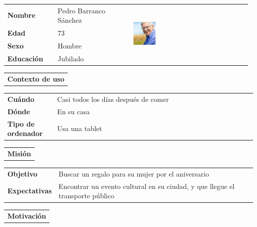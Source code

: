 \documentclass[11pt]{article}
\begin{document}
\newpage
\begin{table}[H]
  \centering
  \begin{tabular}{p{0.2\linewidth}|p{0.3\linewidth}p{0.475\linewidth}}
    \toprule
    \textbf{Nombre} & Pedro Barranco Sánchez &\multirow{4}{*}{\begin{minipage}{1.\textwidth}\includegraphics[width=0.2\textwidth, height=30mm]{Pedro}\end{minipage}}\\
    \textbf{Edad} & 73 & \\
    \textbf{Sexo} & Hombre & \\
    \textbf{Educación} & Jubilado & \\
    \bottomrule
  \end{tabular}

  \begin{tabular}{l}
    \textbf{Contexto de uso} 
  \end{tabular}
  
  \begin{tabular}{p{0.2\linewidth}|p{0.8\linewidth}}
    \toprule
    \textbf{Cuándo} & Casi todos los días después de comer\\
    \textbf{Dónde}  & En su casa\\
    \textbf{Tipo de ordenador} & Usa una tablet\\
    \bottomrule
  \end{tabular}

  \begin{tabular}{l}
    \textbf{Misión} 
  \end{tabular}
  
  \begin{tabular}{p{0.2\linewidth}|p{0.8\linewidth}}
    \toprule
    \textbf{Objetivo} & Buscar un regalo para su mujer por el aniversario\\
    \textbf{Expectativas}  & Encontrar un evento cultural en su ciudad, y que llegue el transporte público \\
    \bottomrule
  \end{tabular}

  \begin{tabular}{l}
    \textbf{Motivación} 
  \end{tabular}


\end{table}
\end{document}
